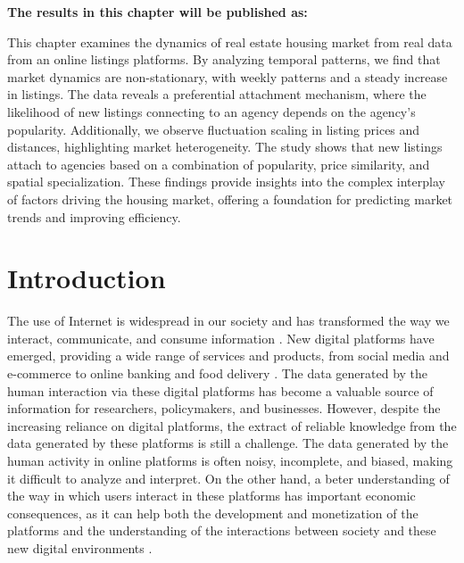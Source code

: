 \vspace{-1.5cm}
\small
\textbf{The results in this chapter will be published as:}
\vspace{0.05 cm}

\normalsize
\vspace{0.5 cm}

This chapter examines the dynamics of real estate housing market from real data from an online listings platforms. By analyzing temporal patterns, we find that market dynamics are non-stationary, with weekly patterns and a steady increase in listings. The data reveals a preferential attachment mechanism, where the likelihood of new listings connecting to an agency depends on the agency's popularity. Additionally, we observe fluctuation scaling in listing prices and distances, highlighting market heterogeneity. The study shows that new listings attach to agencies based on a combination of popularity, price similarity, and spatial specialization. These findings provide insights into the complex interplay of factors driving the housing market, offering a foundation for predicting market trends and improving efficiency.

\section{Introduction}

The use of Internet is widespread in our society and has transformed the way we interact, communicate, and consume information \cite{berners-lee-2006,dorogovtsev2002evolution,pastor-satorras-2004,watts-2007}. New digital platforms have emerged, providing a wide range of services and products, from social media and e-commerce to online banking and food delivery \cite{unknown-author-2013}. The data generated by the human interaction via these digital platforms has become a valuable source of information for researchers, policymakers, and businesses. However, despite the increasing reliance on digital platforms, the extract of reliable knowledge from the data generated by these platforms is still a challenge. The data generated by the human activity in online platforms is often noisy, incomplete, and biased, making it difficult to analyze and interpret. On the other hand, a beter understanding of the way in which users interact in these platforms has important economic consequences, as it can help both the development and monetization of the platforms and the understanding of the interactions between society and these new digital environments \cite{choudary-2016}.

